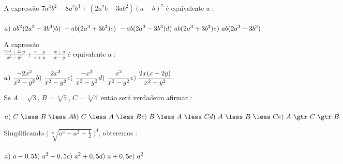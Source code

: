 \hline
\vfill

\begin{quest}
	A express\~ao \(7a^3b^2-8a^2b^3+(2a^2b-3ab^2)(a-b)^2\) \'e equivalente a : \\ \\
	\(\displaystyle a)\ ab^2(2a^3+3b^3) \hfill b)\ -ab(2a^3+3b^3) \\ \\ \hfill c)\ -ab(2a^3-3b^3) \hfill  d)\ ab(2a^3+3b^3) \hfill \\ \\ e)\ ab(2a^3-3b^3) \)
\end{quest}

\hline
\vfill

\begin{quest}
	A express\~ao \\ \(\displaystyle \frac{2x^2+4xy}{x^2-y^2} + \frac{x-y}{x+y} - \frac{x+y}{x-y}\) \'e equivalente a : \\ \\
	\(\displaystyle a)\ \frac{-2x^2}{x^2-y^2} \hfill b)\ \frac{2x^2}{x^2-y^2} \hfill \\ \\ c)\ \frac{-x^2}{x^2-y^2} \hfill  d)\ \frac{x^2}{x^2-y^2} \hfill \\ \\ e)\ \frac{2x(x+2y)}{x^2-y^2} \)
\end{quest}

\hline
\vfill

\begin{quest}
	Se $A = \sqrt{3}$, $B = \sqrt[4]{5}$, $C = \sqrt[3]{4}$ ent\~ao ser\'a verdadeiro afirmar : \\ \\
	\(\displaystyle a)\ C\ \less\ B\ \less\ A \hfill b)\ C\ \less\ A\ \less\ B \hfill \\ c)\ B\ \less\ A\ \less\ C \hfill d)\ A\ \less\ B\ \less\ C \hfill \\ e)\ A\ \gtr\ C\ \gtr\ B \)
\end{quest}

\hline
\vfill

\begin{quest}
	Simplificando \(\displaystyle \bigg(\ \sqrt[8]{a^4-a^2+\frac{1}{2}}\ \bigg)^4\), obteremos : \\ \\
	\(\displaystyle a)\ a - 0,5 \hfill b)\ a^2 - 0,5 \hfill c)\ a^2 + 0,5 \hfill \\ \\ d)\ a + 0,5 \hfill e)\ a^2 \)
\end{quest}

